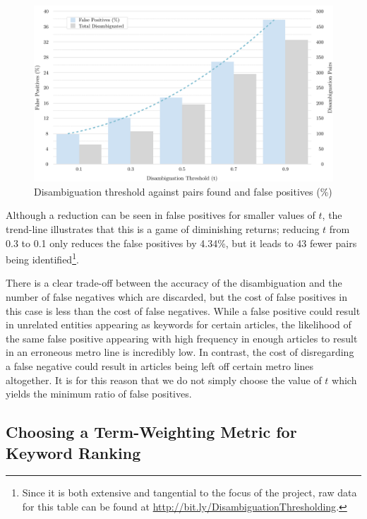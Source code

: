 \begin{figure}[htbp!]
	\centering
	\includegraphics[width=\textwidth]{img/implementation/DisambiguationThreshold.pdf}
	\caption{Disambiguation threshold against pairs found and false positives (\%)}
	\label{fig:dthreshold}
\end{figure}

Although a reduction can be seen in false positives for smaller values of $t$, the trend-line illustrates that this is a game of diminishing returns; reducing $t$ from 0.3 to 0.1 only reduces the false positives by 4.34\%, but it leads to 43 fewer pairs being identified\footnote{Since it is both extensive and tangential to the focus of the project, raw data for this table can be found at \url{http://bit.ly/DisambiguationThresholding}.}. 

There is a clear trade-off between the accuracy of the disambiguation and the number of false negatives which are discarded, but the cost of false positives in this case is less than the cost of false negatives. While a false positive could result in unrelated entities appearing as keywords for certain articles, the likelihood of the same false positive appearing with high frequency in enough articles to result in an erroneous metro line is incredibly low. In contrast, the cost of disregarding a false negative could result in articles being left off certain metro lines altogether. It is for this reason that we do not simply choose the value of $t$ which yields the minimum ratio of false positives.

\subsection{Choosing a Term-Weighting Metric for Keyword Ranking}


